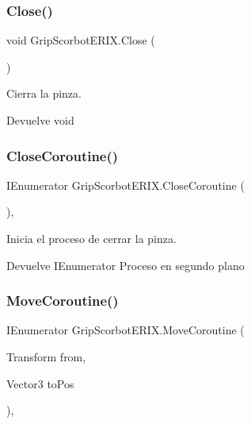 \subsubsection{\texorpdfstring{Close()}{Close()}}
{\footnotesize\ttfamily void Grip\+Scorbot\+E\+R\+I\+X.\+Close (\begin{DoxyParamCaption}{ }\end{DoxyParamCaption})\hspace{0.3cm}{\ttfamily [inline]}}

Cierra la pinza. \begin{DoxyReturn}{Devuelve}
void 
\end{DoxyReturn}
\mbox{\label{class_grip_scorbot_e_r_i_x_a57a849f607ab9a3d606f8b2003f11ce1}} 
\subsubsection{\texorpdfstring{CloseCoroutine()}{CloseCoroutine()}}
{\footnotesize\ttfamily I\+Enumerator Grip\+Scorbot\+E\+R\+I\+X.\+Close\+Coroutine (\begin{DoxyParamCaption}{ }\end{DoxyParamCaption})\hspace{0.3cm}{\ttfamily [inline]}, {\ttfamily [private]}}

Inicia el proceso de cerrar la pinza. \begin{DoxyReturn}{Devuelve}
I\+Enumerator Proceso en segundo plano 
\end{DoxyReturn}
\mbox{\label{class_grip_scorbot_e_r_i_x_a96ea032a05d7c6e6099ed42619693557}} 
\subsubsection{\texorpdfstring{MoveCoroutine()}{MoveCoroutine()}}
{\footnotesize\ttfamily I\+Enumerator Grip\+Scorbot\+E\+R\+I\+X.\+Move\+Coroutine (\begin{DoxyParamCaption}\item[{Transform}]{from,  }\item[{Vector3}]{to\+Pos }\end{DoxyParamCaption})\hspace{0.3cm}{\ttfamily [inline]}, {\ttfamily [private]}}

